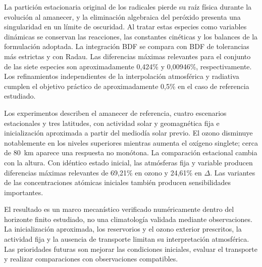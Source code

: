 La partici\'on estacionaria original de los radicales pierde su ra\'iz f\'isica durante la evoluci\'on al amanecer, y la eliminaci\'on algebraica del per\'oxido presenta una singularidad en un l\'imite de oscuridad. Al tratar estas especies como variables din\'amicas se conservan las reacciones, las constantes cin\'eticas y los balances de la formulaci\'on adoptada. La integraci\'on BDF se compara con BDF de tolerancias m\'as estrictas y con Radau. Las diferencias m\'aximas relevantes para el conjunto de las siete especies son aproximadamente 0,424\% y 0,00946\%, respectivamente. Los refinamientos independientes de la interpolaci\'on atmosf\'erica y radiativa cumplen el objetivo pr\'actico de aproximadamente 0,5\% en el caso de referencia estudiado.

Los experimentos describen el amanecer de referencia, cuatro escenarios estacionales y tres latitudes, con actividad solar y geomagn\'etica fija e inicializaci\'on aproximada a partir del mediod\'ia solar previo. El ozono disminuye notablemente en los niveles superiores mientras aumenta el ox\'igeno singlete; cerca de 80~km aparece una respuesta no mon\'otona. La comparaci\'on estacional cambia con la altura. Con id\'entico estado inicial, las atm\'osferas fija y variable producen diferencias m\'aximas relevantes de 69,21\% en ozono y 24,61\% en $\Delta$. Las variantes de las concentraciones at\'omicas iniciales tambi\'en producen sensibilidades importantes.

El resultado es un marco mecan\'istico verificado num\'ericamente dentro del horizonte finito estudiado, no una climatolog\'ia validada mediante observaciones. La inicializaci\'on aproximada, los reservorios y el ozono exterior prescritos, la actividad fija y la ausencia de transporte limitan su interpretaci\'on atmosf\'erica. Las prioridades futuras son mejorar las condiciones iniciales, evaluar el transporte y realizar comparaciones con observaciones compatibles.
